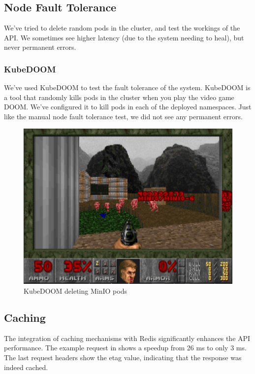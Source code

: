\documentclass{report}
\begin{document}
    \subsection{Node Fault Tolerance}

    We've tried to delete random pods in the cluster, and test the workings of the API. We sometimes see higher latency (due to the system needing to heal), but never permanent errors.

    \subsubsection{KubeDOOM}
    We've used KubeDOOM to test the fault tolerance of the system. KubeDOOM is a tool that randomly kills pods in the cluster when you play the video game DOOM. We've configured it to kill pods in each of the deployed namespaces. Just like the manual node fault tolerance test, we did not see any permanent errors.

    \begin{figure}[H]
        \centering
        \includegraphics[width=\textwidth]{images/kubedoom}
        \caption{KubeDOOM deleting MinIO pods}
        \label{fig:kubedoom}
    \end{figure}

    \subsection{Caching}

    The integration of caching mechanisms with Redis significantly enhances the API performance. The example request in  shows a speedup from 26 ms to only 3 ms. The last request headers show the etag value, indicating that the response was indeed cached.
\end{document}
